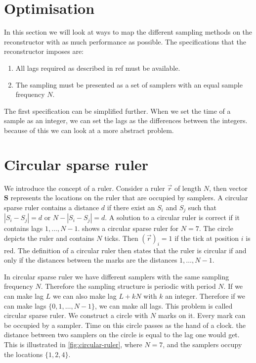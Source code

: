 \documentclass[a4paper, openany, oneside]{memoir}
\begin{document}
\section{Optimisation}
In this section we will look at ways to map the different sampling methods on the reconstructor with as much performance as possible. The specifications that the reconstructor imposes are:

\begin{enumerate}
\item All lags required as described in ref  must be available.
\item The sampling must be presented as a set of samplers with an equal sample frequency $N$.
\end{enumerate} 

The first specification can be simplified further. When we set the time of a sample as an integer, we can set the lags as the differences between the integers. because of this we can look at a more abstract problem. 

\section{Circular sparse ruler}
We introduce the concept of a ruler. Consider a ruler $\vec{r}$ of length $N$, then vector $\mathbf{S}$ represents the locations on the ruler that are occupied by samplers. A circular sparse ruler contains a distance $d$ if there exist an $S_i$ and $S_j$ such that $|S_i-S_j| = d$ or  $N-|S_i-S_j| = d$. A solution to a circular ruler is correct if it contains lags $ 1, \ldots, N - 1$.  shows a circular sparse ruler for $N=7$. The circle depicts the ruler and contains $N$ ticks. Then $(\vec{r})_i = 1$ if the tick at position $i$ is red. The definition of a circular ruler then states that the ruler is circular if and only if the distances between the marks are the distances $1,\ldots,N-1$.

In circular sparse ruler we have different samplers with the same sampling frequency $N$. Therefore the sampling structure is periodic with  period $N$.
If we can make lag $L$ we can also make lag $L+kN$ with $k$ an integer. Therefore if we can make lags $\{0,1,\dots,N-1\}$, we can make all lags. This problem is called circular sparse ruler. We construct a circle with $N$ marks on it. Every mark can be occupied by a sampler. Time on this circle passes as the hand of a clock. the distance between two samplers on the circle is equal to the lag one would get. This is illustrated in \cref{fig:circular-ruler}, where $N=7$, and the samplers occupy the locations $\{1,2,4\}$.
\end{document}
